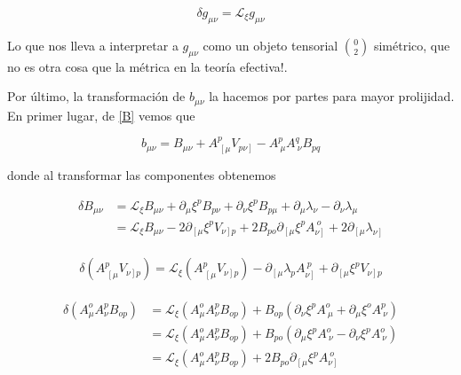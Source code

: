 \documentclass{article}
\numberwithin{equation}{section}
\begin{document}
\begin{boxquation}\label{g}
	\begin{equation}
	\delta g_{\mu \nu}= \mathcal{L}_{\xi} g_{\mu \nu}
	\end{equation}
\end{boxquation}

Lo que nos lleva a interpretar a $ g_{\mu \nu} $ como un objeto tensorial $ \binom{0}{2} $ simétrico, que no es otra cosa que la métrica en la teoría efectiva!.

Por último, la transformación de $ b_{\mu \nu} $ la hacemos por partes para mayor prolijidad. En primer lugar, de \ref{B} vemos que 

\begin{equation}\label{aux0}
b_{\mu \nu} = B_{\mu \nu} + A^p_{\ \left[\mu \right.} V_{\left. p \nu \right]} - A^p_{\ \mu}A^q_{\ \nu} B_{p q}
\end{equation}

donde al transformar las componentes obtenemos

\begin{equation}\label{aux1}
\begin{aligned}
\delta B_{\mu \nu} &= \mathcal{L}_{\xi} B_{\mu \nu} + \partial_{\mu} \xi^p B_{p \nu} + \partial_{\nu} \xi^p B_{p \mu} + \partial_{\mu} \lambda_{\nu} - \partial_{\nu} \lambda_{\mu}\\
&= \mathcal{L}_{\xi} B_{\mu \nu} - 2 \partial_{\left[\mu \right.} \xi^p V_{\left. \nu \right] p} + 2 B_{p o} \partial_{\left[\mu \right.} \xi^p A_{\left. \nu \right]}^{\ o} + 2 \partial_{\left[\mu \right.} \lambda_{\left. \nu \right]}
\end{aligned}
\end{equation}\\

\begin{equation}\label{aux2}
\delta \left( A^p_{\ \left[ \mu\right.} V_{\left.\nu \right] p}\right) = \mathcal{L}_{\xi} \left( A^p_{\ \left[ \mu\right.} V_{\left.\nu \right] p}\right) - \partial_{\left[\mu \right.} \lambda_p A_{\left. \nu \right]}^{\ p} + \partial_{\left[\mu \right.} \xi^p V_{\left. \nu \right] p}
\end{equation}\\


\begin{equation}\label{aux3}
\begin{aligned}
\delta \left( A^o_{\mu} A^p_{\nu} B_{o p} \right) &= \mathcal{L}_{\xi} \left( A^o_{\mu} A^p_{\nu} B_{o p} \right) + B_{o p} \left( \partial_{\nu} \xi^p A^o_{\ \mu} + \partial_{\mu} \xi^o A^p_{\ \nu}  \right)\\
&= \mathcal{L}_{\xi} \left( A^o_{\mu} A^p_{\nu} B_{o p} \right) + B_{p o} \left( \partial_{\mu} \xi^p A^o_{\ \nu} - \partial_{\nu} \xi^p A^o_{\ \nu}  \right)\\
&= \mathcal{L}_{\xi} \left( A^o_{\mu} A^p_{\nu} B_{o p} \right) + 2 B_{p o} \partial_{\left[\mu \right.} \xi^p A_{\left. \nu \right]}^{\ o}
\end{aligned}
\end{equation}
 
\end{document}
